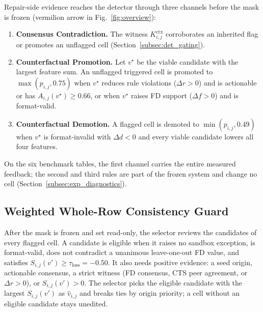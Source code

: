 \documentclass[conference]{IEEEtran}
\begin{document}
Repair-side evidence reaches the detector through three channels before the mask is frozen (vermilion arrow in Fig.~\ref{fig:overview}):
\begin{enumerate}[leftmargin=*, itemsep=0pt, topsep=1pt]
\item \textbf{Consensus Contradiction.} The witness $K_{i,j}^{\mathrm{ctx}}$ corroborates an inherited flag or promotes an unflagged cell (Section~\ref{subsec:det_gating}).
\item \textbf{Counterfactual Promotion.} Let $v^{\star}$ be the viable candidate with the largest feature sum. An unflagged triggered cell is promoted to $\max(p_{i,j}, 0.75)$ when $v^{\star}$ reduces rule violations ($\Delta r > 0$) and is actionable or has $A_{i,j}(v^{\star}) \ge 0.66$, or when $v^{\star}$ raises FD support ($\Delta f > 0$) and is format-valid.
\item \textbf{Counterfactual Demotion.} A flagged cell is demoted to $\min(p_{i,j}, 0.49)$ when $v^{\star}$ is format-invalid with $\Delta d < 0$ and every viable candidate lowers all four features.
\end{enumerate}
On the six benchmark tables, the first channel carries the entire measured feedback; the second and third rules are part of the frozen system and change no cell (Section~\ref{subsec:exp_diagnostics}).

\subsection{Weighted Whole-Row Consistency Guard}
\label{subsec:rep_rowguard}

After the mask is frozen and set read-only, the selector reviews the candidates of every flagged cell. A candidate is eligible when it raises no sandbox exception, is format-valid, does not contradict a unanimous leave-one-out FD value, and satisfies $S_{i,j}(v') \ge \tau_{\mathrm{loss}} = -0.50$. It also needs positive evidence: a seed origin, actionable consensus, a strict witness (FD consensus, CTS peer agreement, or $\Delta r > 0$), or $S_{i,j}(v') > 0$. The selector picks the eligible candidate with the largest $S_{i,j}(v')$ as $\hat{v}_{i,j}$ and breaks ties by origin priority; a cell without an eligible candidate stays unedited.
\end{document}
